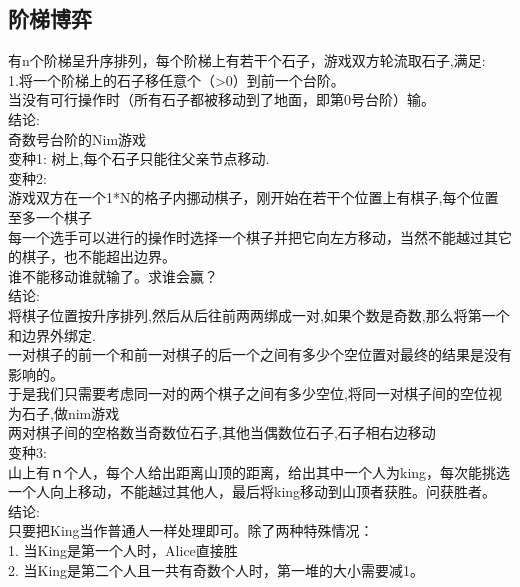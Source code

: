 \documentclass[10pt]{ctexart}
\begin{document}
{\subsection{阶梯博弈}
有n个阶梯呈升序排列，每个阶梯上有若干个石子，游戏双方轮流取石子,满足:\\
1.将一个阶梯上的石子移任意个（>0）到前一个台阶。\\
当没有可行操作时（所有石子都被移动到了地面，即第0号台阶）输。\\
结论:\\
奇数号台阶的Nim游戏\\
变种1:
树上,每个石子只能往父亲节点移动.\\
变种2:\\
游戏双方在一个1*N的格子内挪动棋子，刚开始在若干个位置上有棋子,每个位置至多一个棋子\\
每一个选手可以进行的操作时选择一个棋子并把它向左方移动，当然不能越过其它的棋子，也不能超出边界。\\
谁不能移动谁就输了。求谁会赢？\\
结论:\\
将棋子位置按升序排列,然后从后往前两两绑成一对,如果个数是奇数,那么将第一个和边界外绑定.\\
一对棋子的前一个和前一对棋子的后一个之间有多少个空位置对最终的结果是没有影响的。\\
于是我们只需要考虑同一对的两个棋子之间有多少空位,将同一对棋子间的空位视为石子,做nim游戏\\
两对棋子间的空格数当奇数位石子,其他当偶数位石子,石子相右边移动\\
变种3:\\
山上有ｎ个人，每个人给出距离山顶的距离，给出其中一个人为king，每次能挑选一个人向上移动，不能越过其他人，最后将king移动到山顶者获胜。问获胜者。\\
结论:\\
只要把King当作普通人一样处理即可。除了两种特殊情况：\\
1. 当King是第一个人时，Alice直接胜\\
2. 当King是第二个人且一共有奇数个人时，第一堆的大小需要减1。\\
}
\end{document}
